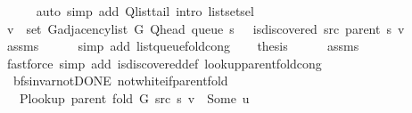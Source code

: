 \begin{isabellebody}
\ \ \ \ \isamarkupfalse%
\ {\isacharparenleft}{\kern0pt}auto\ simp\ add{\isacharcolon}{\kern0pt}\ Q{\isachardot}{\kern0pt}list{\isacharunderscore}{\kern0pt}tail\ intro{\isacharcolon}{\kern0pt}\ list{\isachardot}{\kern0pt}set{\isacharunderscore}{\kern0pt}sel{\isacharparenleft}{\kern0pt}{}{\isacharparenright}{\kern0pt}{\isacharparenright}{\kern0pt}\isanewline
\ \ \isamarkupfalse%
\ {\isachardoublequoteopen}v\ {\isasymin}\ set\ {\isacharparenleft}{\kern0pt}G{\isachardot}{\kern0pt}adjacency{\isacharunderscore}{\kern0pt}list\ G\ {\isacharparenleft}{\kern0pt}Q{\isacharunderscore}{\kern0pt}head\ {\isacharparenleft}{\kern0pt}queue\ s{\isacharparenright}{\kern0pt}{\isacharparenright}{\kern0pt}{\isacharparenright}{\kern0pt}\ {\isasymand}\ {\isasymnot}\ is{\isacharunderscore}{\kern0pt}discovered\ src\ {\isacharparenleft}{\kern0pt}parent\ s{\isacharparenright}{\kern0pt}\ v{\isachardoublequoteclose}\isanewline
\ \ \ \ \isamarkupfalse%
\ assms\isanewline
\ \ \ \ \isamarkupfalse%
\ {\isacharparenleft}{\kern0pt}simp\ add{\isacharcolon}{\kern0pt}\ list{\isacharunderscore}{\kern0pt}queue{\isacharunderscore}{\kern0pt}fold{\isacharunderscore}{\kern0pt}cong{\isacharparenright}{\kern0pt}\isanewline
\ \ \isamarkupfalse%
\ {\isacharquery}{\kern0pt}thesis\isanewline
\ \ \ \ \isamarkupfalse%
\ assms\isanewline
\ \ \ \ \isamarkupfalse%
\ {\isacharparenleft}{\kern0pt}fastforce\ simp\ add{\isacharcolon}{\kern0pt}\ is{\isacharunderscore}{\kern0pt}discovered{\isacharunderscore}{\kern0pt}def\ lookup{\isacharunderscore}{\kern0pt}parent{\isacharunderscore}{\kern0pt}fold{\isacharunderscore}{\kern0pt}cong{\isacharparenright}{\kern0pt}\isanewline
{}\isamarkupfalse%
%
\endisatagproof
{\isafoldproof}%
%
\isadelimproof
\isanewline
%
\endisadelimproof
\isanewline
{}\isamarkupfalse%
\ {\isacharparenleft}{\kern0pt}\ bfs{\isacharunderscore}{\kern0pt}invar{\isacharunderscore}{\kern0pt}not{\isacharunderscore}{\kern0pt}DONE{\isacharparenright}{\kern0pt}\ not{\isacharunderscore}{\kern0pt}white{\isacharunderscore}{\kern0pt}if{\isacharunderscore}{\kern0pt}parent{\isacharunderscore}{\kern0pt}fold{\isacharcolon}{\kern0pt}\isanewline
\ \ \ {\isachardoublequoteopen}P{\isacharunderscore}{\kern0pt}lookup\ {\isacharparenleft}{\kern0pt}parent\ {\isacharparenleft}{\kern0pt}fold\ G\ src\ s{\isacharparenright}{\kern0pt}{\isacharparenright}{\kern0pt}\ v\ {\isacharequal}{\kern0pt}\ Some\ u{\isachardoublequoteclose}\isanewline

\end{isabellebody}

